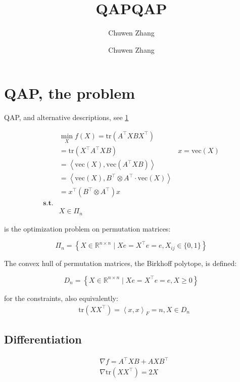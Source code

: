 \documentclass[
  10pt,
  a4paper,
,tablecaptionabove
]{scrartcl}
\title{QAP}
\author{Chuwen Zhang}
\date{}
\title{QAP}
\author{Chuwen Zhang}
\begin{document}




\hypertarget{qap-the-problem}{%
\section{QAP, the problem}\label{qap-the-problem}}

QAP, and alternative descriptions, see
\protect\hyperlink{ref-jiang_l_p-norm_2016}{1}

\[\begin{aligned}
&\min_X f(X) = \textrm{tr}(A^\top XB X^\top)  \\
& = \textrm{tr}(X^\top A^\top XB) & x = \textrm{vec}(X)\\
& = \left <\textrm{vec}(X),  \textrm{vec}(A^\top X B )  \right > \\
& = \left <\textrm{vec}(X), B^\top \otimes A^\top \cdot \textrm{vec}(X)  \right > \\ 
& = x^\top (B^\top \otimes A^\top) x\\ 
\mathbf{s.t.} & \\ 
&X \in \Pi_{n}
\end{aligned}\]

is the optimization problem on permutation matrices:

\[ \Pi_{n}=\left\{X \in \mathbb R ^{n \times n} \mid X e =X^{\top} e = e , X_{i j} \in\{0,1\}\right\}\]

The convex hull of permutation matrices, the Birkhoﬀ polytope, is
defined:

\[D _{n}=\left\{X \in \mathbb R ^{n \times n} \mid X e =X^{\top} e = e , X \geq 0 \right\}\]

for the constraints, also equivalently: \[\begin{aligned}
& \textrm{tr}(XX^\top) = \left <x, x \right >_F= n, X \in D_{n}
\end{aligned}\]

\hypertarget{differentiation}{%
\subsection{Differentiation}\label{differentiation}}

\[\begin{aligned}
&  \nabla f = A^\top XB + AXB^\top \\
& \nabla \textrm{tr}(XX^\top) = 2X
\end{aligned}\]
\end{document}
